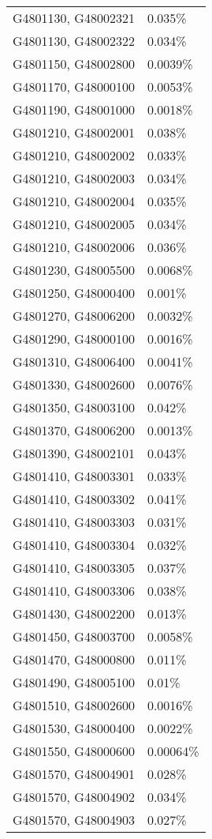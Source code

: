 \begin{longtable}[]{@{}ll@{}}
G4801130, G48002321 & 0.035\% \\
G4801130, G48002322 & 0.034\% \\
G4801150, G48002800 & 0.0039\% \\
G4801170, G48000100 & 0.0053\% \\
G4801190, G48001000 & 0.0018\% \\
G4801210, G48002001 & 0.038\% \\
G4801210, G48002002 & 0.033\% \\
G4801210, G48002003 & 0.034\% \\
G4801210, G48002004 & 0.035\% \\
G4801210, G48002005 & 0.034\% \\
G4801210, G48002006 & 0.036\% \\
G4801230, G48005500 & 0.0068\% \\
G4801250, G48000400 & 0.001\% \\
G4801270, G48006200 & 0.0032\% \\
G4801290, G48000100 & 0.0016\% \\
G4801310, G48006400 & 0.0041\% \\
G4801330, G48002600 & 0.0076\% \\
G4801350, G48003100 & 0.042\% \\
G4801370, G48006200 & 0.0013\% \\
G4801390, G48002101 & 0.043\% \\
G4801410, G48003301 & 0.033\% \\
G4801410, G48003302 & 0.041\% \\
G4801410, G48003303 & 0.031\% \\
G4801410, G48003304 & 0.032\% \\
G4801410, G48003305 & 0.037\% \\
G4801410, G48003306 & 0.038\% \\
G4801430, G48002200 & 0.013\% \\
G4801450, G48003700 & 0.0058\% \\
G4801470, G48000800 & 0.011\% \\
G4801490, G48005100 & 0.01\% \\
G4801510, G48002600 & 0.0016\% \\
G4801530, G48000400 & 0.0022\% \\
G4801550, G48000600 & 0.00064\% \\
G4801570, G48004901 & 0.028\% \\
G4801570, G48004902 & 0.034\% \\
G4801570, G48004903 & 0.027\% \\

\end{longtable}
